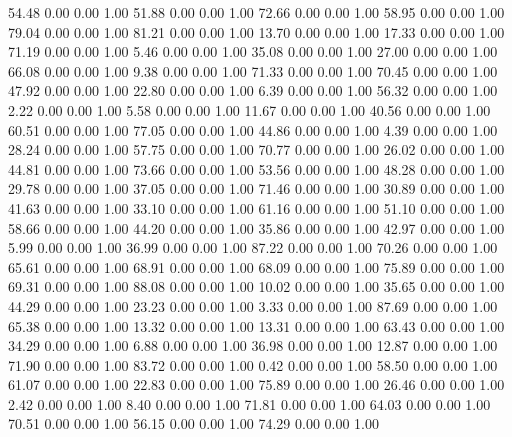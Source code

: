    54.48   0.00   0.00   1.00
   51.88   0.00   0.00   1.00
   72.66   0.00   0.00   1.00
   58.95   0.00   0.00   1.00
   79.04   0.00   0.00   1.00
   81.21   0.00   0.00   1.00
   13.70   0.00   0.00   1.00
   17.33   0.00   0.00   1.00
   71.19   0.00   0.00   1.00
    5.46   0.00   0.00   1.00
   35.08   0.00   0.00   1.00
   27.00   0.00   0.00   1.00
   66.08   0.00   0.00   1.00
    9.38   0.00   0.00   1.00
   71.33   0.00   0.00   1.00
   70.45   0.00   0.00   1.00
   47.92   0.00   0.00   1.00
   22.80   0.00   0.00   1.00
    6.39   0.00   0.00   1.00
   56.32   0.00   0.00   1.00
    2.22   0.00   0.00   1.00
    5.58   0.00   0.00   1.00
   11.67   0.00   0.00   1.00
   40.56   0.00   0.00   1.00
   60.51   0.00   0.00   1.00
   77.05   0.00   0.00   1.00
   44.86   0.00   0.00   1.00
    4.39   0.00   0.00   1.00
   28.24   0.00   0.00   1.00
   57.75   0.00   0.00   1.00
   70.77   0.00   0.00   1.00
   26.02   0.00   0.00   1.00
   44.81   0.00   0.00   1.00
   73.66   0.00   0.00   1.00
   53.56   0.00   0.00   1.00
   48.28   0.00   0.00   1.00
   29.78   0.00   0.00   1.00
   37.05   0.00   0.00   1.00
   71.46   0.00   0.00   1.00
   30.89   0.00   0.00   1.00
   41.63   0.00   0.00   1.00
   33.10   0.00   0.00   1.00
   61.16   0.00   0.00   1.00
   51.10   0.00   0.00   1.00
   58.66   0.00   0.00   1.00
   44.20   0.00   0.00   1.00
   35.86   0.00   0.00   1.00
   42.97   0.00   0.00   1.00
    5.99   0.00   0.00   1.00
   36.99   0.00   0.00   1.00
   87.22   0.00   0.00   1.00
   70.26   0.00   0.00   1.00
   65.61   0.00   0.00   1.00
   68.91   0.00   0.00   1.00
   68.09   0.00   0.00   1.00
   75.89   0.00   0.00   1.00
   69.31   0.00   0.00   1.00
   88.08   0.00   0.00   1.00
   10.02   0.00   0.00   1.00
   35.65   0.00   0.00   1.00
   44.29   0.00   0.00   1.00
   23.23   0.00   0.00   1.00
    3.33   0.00   0.00   1.00
   87.69   0.00   0.00   1.00
   65.38   0.00   0.00   1.00
   13.32   0.00   0.00   1.00
   13.31   0.00   0.00   1.00
   63.43   0.00   0.00   1.00
   34.29   0.00   0.00   1.00
    6.88   0.00   0.00   1.00
   36.98   0.00   0.00   1.00
   12.87   0.00   0.00   1.00
   71.90   0.00   0.00   1.00
   83.72   0.00   0.00   1.00
    0.42   0.00   0.00   1.00
   58.50   0.00   0.00   1.00
   61.07   0.00   0.00   1.00
   22.83   0.00   0.00   1.00
   75.89   0.00   0.00   1.00
   26.46   0.00   0.00   1.00
    2.42   0.00   0.00   1.00
    8.40   0.00   0.00   1.00
   71.81   0.00   0.00   1.00
   64.03   0.00   0.00   1.00
   70.51   0.00   0.00   1.00
   56.15   0.00   0.00   1.00
   74.29   0.00   0.00   1.00
